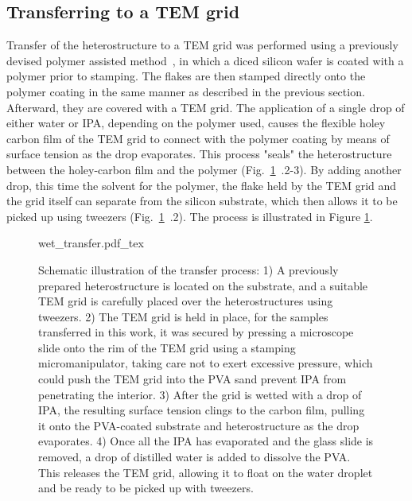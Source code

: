 \subsection{Transferring to a TEM grid}

Transfer of the heterostructure to a TEM grid was performed using a previously devised polymer assisted method~\cite{kosterPolymerassistedTEMSpecimen2021}, in which a diced silicon wafer is coated with a polymer prior to stamping.
%
The flakes are then stamped directly onto the polymer coating in the same manner as described in the previous section. Afterward, they are covered with a TEM grid. The application of a single drop of either water or IPA,  depending on the polymer used, causes the flexible holey carbon film of the TEM grid to connect with the polymer coating by means of surface tension as the drop evaporates. This process "seals" the heterostructure between the holey-carbon film and the polymer (Fig.~\ref{fig:wet_transfer}~.2-3). By adding another drop, this time the solvent for the polymer, the flake held by the TEM grid and the grid itself can separate from the silicon substrate, which then allows it to be picked up using tweezers (Fig.~\ref{fig:wet_transfer}~.2). The process is illustrated in Figure \ref{fig:wet_transfer}.

\begin{figure}[h]
	\centering
	\def\svgwidth{1\linewidth}
	{wet_transfer.pdf_tex}
	\caption{Schematic illustration of the transfer process: 1) A previously prepared heterostructure is located on the substrate, and a suitable TEM grid is carefully placed over the heterostructures using tweezers. 2) The TEM grid is held in place, for the samples transferred in this work, it was secured by pressing a microscope slide onto the rim of the TEM grid using a stamping micromanipulator, taking care not to exert excessive pressure, which could push the TEM grid into the PVA sand prevent IPA from penetrating the interior. 3) After the grid is wetted with a drop of IPA, the resulting surface tension clings to the carbon film, pulling it onto the PVA-coated substrate and heterostructure as the drop evaporates. 4) Once all the IPA has evaporated and the glass slide is removed, a drop of distilled water is added to dissolve the PVA. This releases the TEM grid, allowing it to float on the water droplet and be ready to be picked up with tweezers.}
	\label{fig:wet_transfer}
\end{figure}

